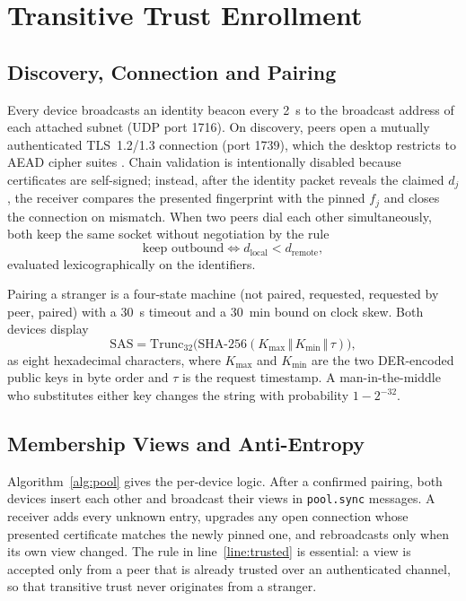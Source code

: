 \documentclass[conference,a4paper]{IEEEtran}
\begin{document}
\section{Transitive Trust Enrollment}
\label{sec:trust}
\subsection{Discovery, Connection and Pairing}
Every device broadcasts an identity beacon every 2~s to the broadcast address of each attached subnet (UDP port 1716). On discovery, peers open a mutually authenticated TLS~1.2/1.3 connection (port 1739), which the desktop restricts to AEAD cipher suites \cite{rfc8446}. Chain validation is intentionally disabled because certificates are self-signed; instead, after the identity packet reveals the claimed $d_j$, the receiver compares the presented fingerprint with the pinned $f_j$ and closes the connection on mismatch. When two peers dial each other simultaneously, both keep the same socket without negotiation by the rule
\begin{equation}
\text{keep outbound}\iff d_{\mathrm{local}}<d_{\mathrm{remote}},
\end{equation}
evaluated lexicographically on the identifiers.

Pairing a stranger is a four-state machine (not paired, requested, requested by peer, paired) with a 30~s timeout and a 30~min bound on clock skew. Both devices display
\begin{equation}
\mathrm{SAS}=\mathrm{Trunc}_{32}\big(\mathrm{SHA\text{-}256}(K_{\max}\,\Vert\,K_{\min}\,\Vert\,\tau)\big),
\end{equation}
as eight hexadecimal characters, where $K_{\max}$ and $K_{\min}$ are the two DER-encoded public keys in byte order and $\tau$ is the request timestamp. A man-in-the-middle who substitutes either key changes the string with probability $1-2^{-32}$.

\subsection{Membership Views and Anti-Entropy}
Algorithm~\ref{alg:pool} gives the per-device logic. After a confirmed pairing, both devices insert each other and broadcast their views in \texttt{pool.sync} messages. A receiver adds every unknown entry, upgrades any open connection whose presented certificate matches the newly pinned one, and rebroadcasts only when its own view changed. The rule in line~\ref{line:trusted} is essential: a view is accepted only from a peer that is already trusted over an authenticated channel, so that transitive trust never originates from a stranger.
\end{document}
